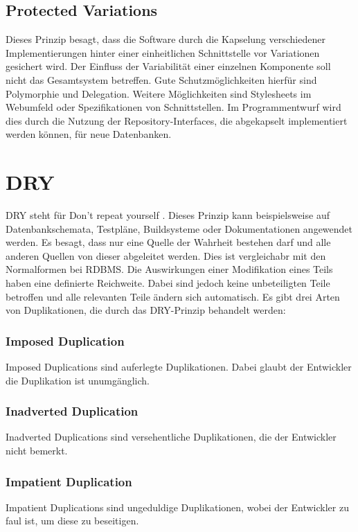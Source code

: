 \subsection{Protected Variations}
Dieses Prinzip besagt, dass die Software durch die Kapselung verschiedener Implementierungen hinter einer einheitlichen Schnittstelle vor Variationen gesichert wird. Der Einfluss der Variabilität einer einzelnen Komponente soll nicht das 
Gesamtsystem betreffen. Gute Schutzmöglichkeiten hierfür sind Polymorphie und Delegation. Weitere Möglichkeiten sind Stylesheets im Webumfeld oder Spezifikationen von Schnittstellen.
\newline Im Programmentwurf wird dies durch die Nutzung der Repository-Interfaces, die abgekapselt implementiert werden können, für neue Datenbanken.

\section{DRY}
DRY steht für \glqq Don't repeat yourself \grqq . Dieses Prinzip kann beispielsweise auf Datenbankschemata, Testpläne, Buildsysteme oder Dokumentationen angewendet werden. Es besagt, dass nur eine Quelle der 
Wahrheit bestehen darf und alle anderen Quellen von dieser abgeleitet werden. Dies ist vergleichabr mit den Normalformen bei RDBMS.
\newline Die Auswirkungen einer Modifikation eines Teils haben eine definierte Reichweite. Dabei sind jedoch keine unbeteiligten Teile betroffen und alle relevanten Teile ändern sich automatisch.
\newline Es gibt drei Arten von Duplikationen, die durch das DRY-Prinzip behandelt werden:
\subsubsection{Imposed Duplication}
Imposed Duplications sind auferlegte Duplikationen. Dabei glaubt der Entwickler die Duplikation ist unumgänglich.
\subsubsection{Inadverted Duplication}
Inadverted Duplications sind versehentliche Duplikationen, die der Entwickler nicht bemerkt.
\subsubsection{Impatient Duplication}
Impatient Duplications sind ungeduldige Duplikationen, wobei der Entwickler zu faul ist, um diese zu beseitigen.
